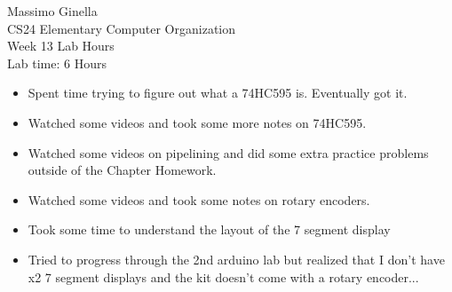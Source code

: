\documentclass[12pt]{article}
\begin{document}
	\begin{center}
		Massimo Ginella \\
		CS24 Elementary Computer Organization \\
		Week 13 Lab Hours \\
		Lab time: 6 Hours \vspace{0.5cm} \\
	\end{center}
	
	\begin{itemize}
		\item Spent time trying to figure out what a 74HC595 is. Eventually got it.
		\item Watched some videos and took some more notes on 74HC595.
		\item Watched some videos on pipelining and did some extra practice problems outside of the Chapter Homework.
		\item Watched some videos and took some notes on rotary encoders.
		\item Took some time to understand the layout of the 7 segment display
		\item Tried to progress through the 2nd arduino lab but realized that I don't have x2 7 segment displays and the kit doesn't come with a rotary encoder...
	\end{itemize}
	
	
	
\end{document}

